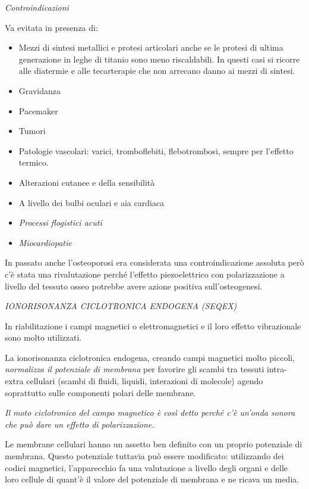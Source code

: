 \documentclass[]{article}
\begin{document}
\emph{Controindicazioni}

Va evitata in presenza di:

\begin{itemize}
\item
  Mezzi di sintesi metallici e protesi articolari anche se le protesi di
  ultima generazione in leghe di titanio sono meno riscaldabili. In
  questi casi si ricorre alle diatermie e alle tecarterapie che non
  arrecano danno ai mezzi di sintesi.
\item
  Gravidanza
\item
  Pacemaker
\item
  Tumori
\item
  Patologie vascolari: varici, tromboflebiti, flebotrombosi, sempre per
  l'effetto termico.
\item
  Alterazioni cutanee e della sensibilità
\item
  A livello dei bulbi oculari e aia cardiaca
\item
  \emph{Processi flogistici acuti}
\item
  \emph{Miocardiopatie}
\end{itemize}

In passato anche l'osteoporosi era considerata una controindicazione
assoluta però c'è stata una rivalutazione perché l'effetto
piezoelettrico con polarizzazione a livello del tessuto osseo potrebbe
avere azione positiva sull'osteogenesi.

\emph{IONORISONANZA CICLOTRONICA ENDOGENA (SEQEX)}

In riabilitazione i campi magnetici o elettromagnetici e il loro effetto
vibrazionale sono molto utilizzati.

La ionorisonanza ciclotronica endogena, creando campi magnetici molto
piccoli, \emph{normalizza il potenziale di membrana} per favorire gli
scambi tra tessuti intra-extra cellulari (scambi di fluidi, liquidi,
interazioni di molecole) agendo soprattutto sulle componenti polari
delle membrane.

\emph{Il moto ciclotronico del campo magnetico è così detto perché c'è
un'onda sonora che può dare un effetto di polarizzazione.}

Le membrane cellulari hanno un assetto ben definito con un proprio
potenziale di membrana. Questo potenziale tuttavia può essere
modificato: utilizzando dei codici magnetici, l'apparecchio fa una
valutazione a livello degli organi e delle loro cellule di quant'è il
valore del potenziale di membrana e ne ricava un media.
\end{document}
